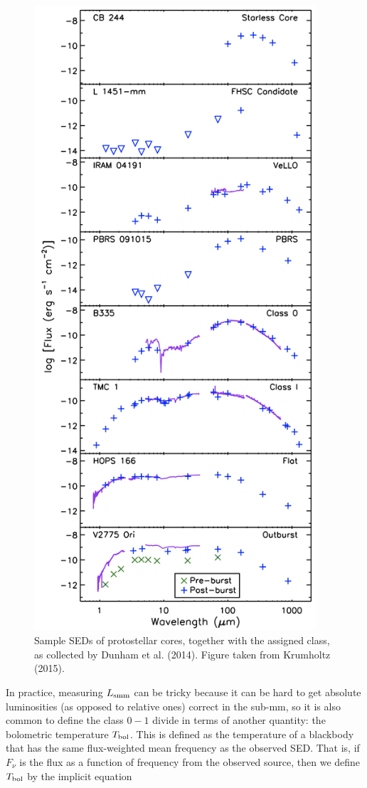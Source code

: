 \documentclass[a4paper,10pt]{article}
\begin{document}
\begin{figure}[t!]
    \centering
    \includegraphics[width=10.5cm]{figures/ProtostellarSEDs.png}
    \caption{\footnotesize{Sample SEDs of protostellar cores, together with the assigned class, as collected by Dunham et al. (2014). Figure taken from Krumholtz (2015).}}
    \label{fig:protostellarseds}
\end{figure}

{\noindent}In practice, measuring $L_{\rm smm}$ can be tricky because it can be hard to get absolute luminosities (as opposed to relative ones) correct in the sub-mm, so it is also common to define the class $0-1$ divide in terms of another quantity: the bolometric temperature $T_{\rm bol}$. This is defined as the temperature of a blackbody that has the same flux-weighted mean frequency as the observed SED. That is, if $F_\nu$ is the flux as a function of frequency from the observed source, then we define $T_{\rm bol}$ by the implicit equation 
\end{document}
